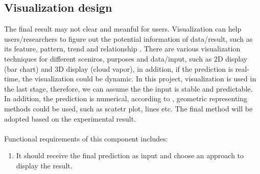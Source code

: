 \subsection{Visualization design}
The final result may not clear and meanful for users. Visualization can help users/researchers to figure out the potential information of data/result, such as its feature, pattern, trend and relationship \cite{grinstein2002information}. There are various visualization techniques for different sceniros, purposes and data/input, such as 2D display (bar chart) and 3D display (cloud vapor), in addition, if the prediction is real-time, the visualization could be dynamic.  In this project, visualization is used in the last stage, therefore, we can assume the the input is stable and predictable. In addition, the prediction is numerical, according to \cite{grinstein2002information}, geometric representing methods could be used, such as scatetr plot, lines etc. The final method will be adopted based on the experimental result.\\\\
Functional requirements of this component includes:
\begin{enumerate}
    \item It should receive the final prediction as input and choose an approach to display the result.
\end{enumerate}